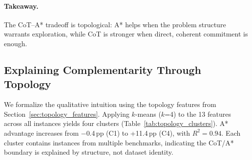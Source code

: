 \documentclass{article}
\begin{document}
\paragraph{Takeaway.}
The CoT--A* tradeoff is topological: A* helps when the problem structure warrants exploration, while CoT is stronger when direct, coherent commitment is enough.
\subsection{Explaining Complementarity Through Topology}
\label{sec:topology_clusters}

We formalize the qualitative intuition using the topology features from Section~\ref{sec:topology_features}. Applying $k$-means ($k$=4) to the 13 features across all instances yields four clusters (Table~\ref{tab:topology_clusters}). A* advantage increases from $-$0.4\,pp (C1) to +11.4\,pp (C4), with $R^2 = 0.94$. Each cluster contains instances from multiple benchmarks, indicating the CoT/A* boundary is explained by structure, not dataset identity.

\begin{table}[t]
\centering
\small
{}
\caption{Reasoning topology clusters. BC = branching coefficient. A* advantage grows monotonically with branching complexity.}
\label{tab:topology_clusters}
\end{table}
\end{document}
